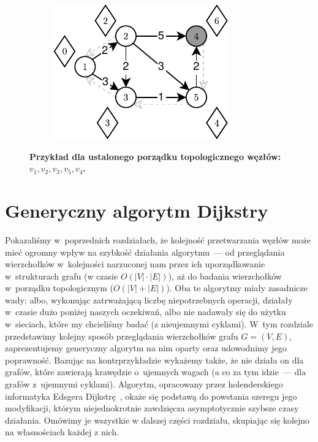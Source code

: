 \begin{figure}[!htbp]
\begin{subfigure}[b]{0.19\textwidth}
		\includegraphics[width=\textwidth]{Chapter_II/TOPOLOGIC-SHORTEST-PATH-Example/e.pdf}
		\caption{}
		\label{fig:exampleTopologicalShotrestPath:e}
	\end{subfigure}
	\hfill\null
	\caption{
		\textbf{Przykład dla ustalonego porządku topologicznego węzłów: $v_{1}, v_{2}, v_{3}, v_{5}, v_{4}$.}
	}
	\label{fig:exampleTopologicalShotrestPath}
\end{figure}




\section{Generyczny algorytm Dijkstry}
\label{sec:dijkstraGenericAlgorithm}




Pokazaliśmy w~poprzednich rozdziałach, że kolejność przetwarzania węzłów może mieć ogromny wpływ na szybkość działania algorytmu~--- od przeglądania wierzchołków w~kolejności narzuconej nam przez ich uporządkowanie w~strukturach grafu (w czasie $O \left( \left| V \right| \cdot \left| E \right| \right)$), aż do badania wierzchołków w~porządku topologicznym ($ O \left( \left| V \right| + \left| E \right| \right)$).
Oba te algorytmy miały zasadnicze wady: albo, wykonując zatrważającą liczbę niepotrzebnych operacji, działały w~czasie dużo poniżej naszych oczekiwań, albo nie nadawały się do użytku w~sieciach, które my chcieliśmy badać (z nieujemnymi cyklami).
W~tym rozdziale przedstawimy kolejny sposób przeglądania wierzchołków grafu $G = \left( V, E \right)$, zaprezentujemy generyczny algorytm na nim oparty oraz udowodnimy jego poprawność.
Bazując na kontrprzykładzie wykażemy także, że nie działa on dla grafów, które zawierają krawędzie o~ujemnych wagach (a co za tym idzie~--- dla grafów z~ujemnymi cyklami).
Algorytm, opracowany przez holenderskiego informatyka Edsgera Dijkstrę~\cite[$4.5$]{Ahuja:1993:NFT:137406}, okaże się podstawą do powstania szeregu jego modyfikacji, którym niejednokrotnie zawdzięcza asymptotycznie szybsze czasy działania. Omówimy je wszystkie w dalszej części rozdziału, skupiając się kolejno na własnościach każdej z nich.



